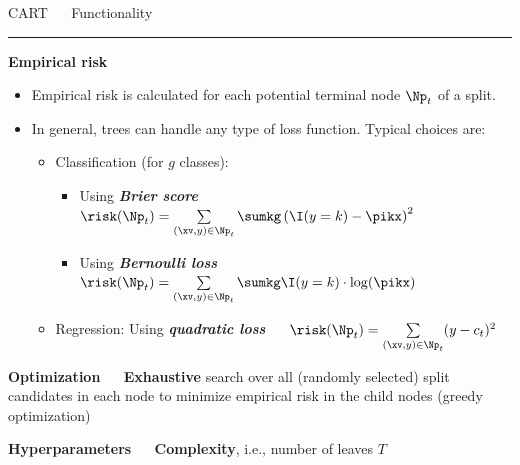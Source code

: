 \documentclass[11pt,compress,t,notes=noshow, xcolor=table]{beamer}
\begin{document}

\LARGE
\begin{frame}{\textcolor{gray!80}{CART} ~~ Functionality}
\normalsize
\vspace{-0.5cm}
\noindent \textcolor{gray!80}{\rule{\textwidth}{1pt}}

\vspace{0.3cm}

\footnotesize

\textbf{\textcolor{gray!80}{Empirical risk}} \\

\begin{itemize}
  \item Empirical risk is calculated for each potential terminal node $\Np_t$
  of a split.
  \item In general, trees can handle any type of loss function. Typical choices
  are:
  \begin{itemize}
    \footnotesize
    \item Classification (for $g$ classes):
    \begin{itemize}
      \footnotesize
      \item Using \textit{\textbf{Brier score}} ~~
      $\risk(\Np_t) = \sum\limits_{(\xv,y) \in \Np_t} \sumkg \left( \I(y = k)
      - \pikx \right)^2$
      \item Using \textit{\textbf{Bernoulli loss}} ~~
      $\risk(\Np_t) = \sum\limits_{(\xv,y) \in \Np_t} \sumkg \I(y = k) \cdot
      \log(\pikx)$
    \end{itemize}
    \item Regression: Using \textit{\textbf{quadratic loss}} ~~
    $\risk(\Np_t) = \sum\limits_{(\xv,y) \in \Np_t} (y - c_t)^2$
  \end{itemize}
\end{itemize}

\medskip

\textbf{\textcolor{gray!80}{Optimization}} ~~ \textbf{Exhaustive} search over
all (randomly selected) split candidates in each node to minimize empirical risk 
in the child nodes (greedy optimization) \\

\medskip

\textbf{\textcolor{gray!80}{Hyperparameters}} ~~ \textbf{Complexity}, i.e., 
number of leaves $T$ \\

\normalsize
  
\end{frame}
\end{document}
